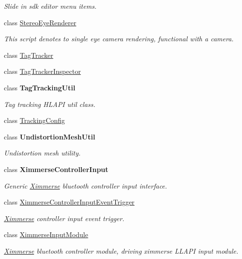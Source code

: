 \begin{DoxyCompactItemize}
\begin{DoxyCompactList}\small\item\em Slide in sdk editor menu items. \end{DoxyCompactList}\item 
class \mbox{\hyperlink{class_ximmerse_1_1_slide_in_s_d_k_1_1_stereo_eye_renderer}{Stereo\+Eye\+Renderer}}
\begin{DoxyCompactList}\small\item\em This script denotes to single eye camera rendering, functional with a camera. \end{DoxyCompactList}\item 
class \mbox{\hyperlink{class_ximmerse_1_1_slide_in_s_d_k_1_1_tag_tracker}{Tag\+Tracker}}
\item 
class \mbox{\hyperlink{class_ximmerse_1_1_slide_in_s_d_k_1_1_tag_tracker_inspector}{Tag\+Tracker\+Inspector}}
\item 
class {\bfseries Tag\+Tracking\+Util}
\begin{DoxyCompactList}\small\item\em Tag tracking H\+L\+A\+PI util class. \end{DoxyCompactList}\item 
class \mbox{\hyperlink{class_ximmerse_1_1_slide_in_s_d_k_1_1_tracking_config}{Tracking\+Config}}
\item 
class {\bfseries Undistortion\+Mesh\+Util}
\begin{DoxyCompactList}\small\item\em Undistortion mesh utility. \end{DoxyCompactList}\item 
class {\bfseries Ximmerse\+Controller\+Input}
\begin{DoxyCompactList}\small\item\em Generic \mbox{\hyperlink{namespace_ximmerse}{Ximmerse}} bluetooth controller input interface. \end{DoxyCompactList}\item 
class \mbox{\hyperlink{class_ximmerse_1_1_slide_in_s_d_k_1_1_ximmerse_controller_input_event_trigger}{Ximmerse\+Controller\+Input\+Event\+Trigger}}
\begin{DoxyCompactList}\small\item\em \mbox{\hyperlink{namespace_ximmerse}{Ximmerse}} controller input event trigger. \end{DoxyCompactList}\item 
class \mbox{\hyperlink{class_ximmerse_1_1_slide_in_s_d_k_1_1_ximmerse_input_module}{Ximmerse\+Input\+Module}}
\begin{DoxyCompactList}\small\item\em \mbox{\hyperlink{namespace_ximmerse}{Ximmerse}} bluetooth controller module, driving ximmerse L\+L\+A\+PI input module. \end{DoxyCompactList}\end{DoxyCompactItemize}
